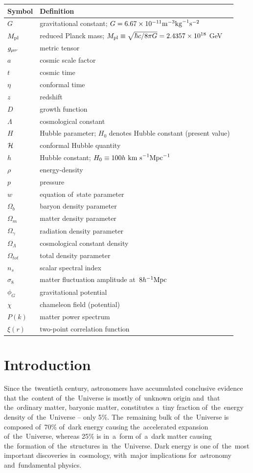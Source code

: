 \begin{tabular}{ll}
\hline\hline
Symbol & Definition \\
\hline
$G$ & gravitational constant; $G=6.67\times10^{-11}\rm{m}^{-3}\rm{kg}^{-1}\rm{s}^{-2}$ \\
$M_{\text{\scriptsize pl}}$ & reduced Planck mass; $M_{\text{\scriptsize pl}}\equiv\sqrt{\hbar c/8\pi G} = 2.4357\times10^{18}$ GeV\\
$g_{\mu\nu}$ & metric tensor \\
$a$ & cosmic scale factor \\
$t$ & cosmic time \\
$\eta$ & conformal time \\
$z$ & redshift \\
$D$ & growth function \\
$\Lambda$ & cosmological constant \\
$H$ & Hubble parameter; $H_0$ denotes Hubble constant (present value) \\
$\mathcal{H}$ & conformal Hubble quantity \\
$h$ & Hubble constant; $H_0\equiv100 h \rm{\ km\ s}^{-1}\rm{Mpc}^{-1}$ \\
$\rho$ & energy-density \\
$p$ & pressure \\
$w$ & equation of~state parameter \\
$\Omega_b$ & baryon density parameter \\
$\Omega_m$ & matter density parameter \\
$\Omega_\gamma$ & radiation density parameter \\
$\Omega_\Lambda$ & cosmological constant density \\
$\Omega_{tot}$ & total density parameter \\
$n_s$ & scalar spectral index \\
$\sigma_8$ & matter fluctuation amplitude at~$8h^{-1}\text{Mpc}$ \\
$\phi_G$ & gravitational potential \\
$\chi$ & chameleon field (potential) \\
$P(k)$ & matter power spectrum \\
$\xi(r)$ & two-point correlation function \\
\hline


\hline\hline
\end{tabular}\clearpage{}

\clearpage{}\chapter*{Introduction}
Since the~twentieth century, astronomers have accumulated conclusive evidence that the~content of~the~Universe is mostly of~unknown origin and~that the~ordinary matter, baryonic matter, constitutes a~tiny fraction of~the~energy density of~the~Universe -- only 5\%. The~remaining bulk of~the~Universe is composed of~70\% of~dark energy causing the~accelerated expansion of~the~Universe, whereas 25\% is in~a~form of~a~dark matter causing the~formation of~the~structures in~the~Universe. Dark energy is one of~the~most important discoveries in~cosmology, with~major implications for~astronomy and~fundamental physics.

